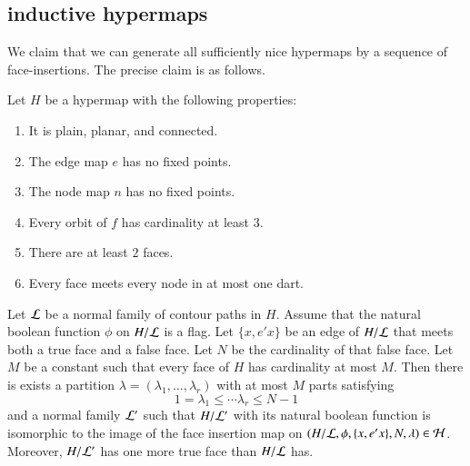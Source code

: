 \subsection{inductive hypermaps}

We claim that we can generate all sufficiently nice hypermaps by a
sequence of face-insertions.  The precise claim is as follows.

\begin{lemma}  Let $H$ be a hypermap with the following properties:
    \begin{enumerate}
        \item It is plain, planar, and connected.
        \item The edge map $e$ has no fixed points.
        \item The node map $n$ has no fixed points.
        \item Every orbit of $f$ has cardinality at least $3$.
        \item There are at least $2$ faces. 
        \item Every face meets every node in at most one
        dart.
    \end{enumerate}
Let $\cal L$ be a normal family of contour paths in $H$. Assume that
the natural boolean function $\phi$ on $H/{\cal L}$ is a flag. Let
$\{x,e' x\}$ be an edge of $H/{\cal L}$ that meets both a true face
and a false face. Let $N$ be the cardinality of that false face. Let
$M$ be a constant such that every face of $H$ has cardinality at
most $M$. Then there is exists a partition $\lambda=(\lambda_1,\ldots,\lambda_r)$ with at most
$M$ parts satisfying $$1=\lambda_1\le \cdots\lambda_r \le N-1$$
and a normal family
${\cal L}'$ such that $H/{\cal L}'$ with its natural boolean
function is isomorphic to the image of the face insertion map on
$(H/{\cal L},\phi,\{x,e' x\},N,\lambda)\in {\cal H}$. 
Moreover, $H/{\cal L}'$
has one more true face than $H/{\cal L}$ has.
\end{lemma}

